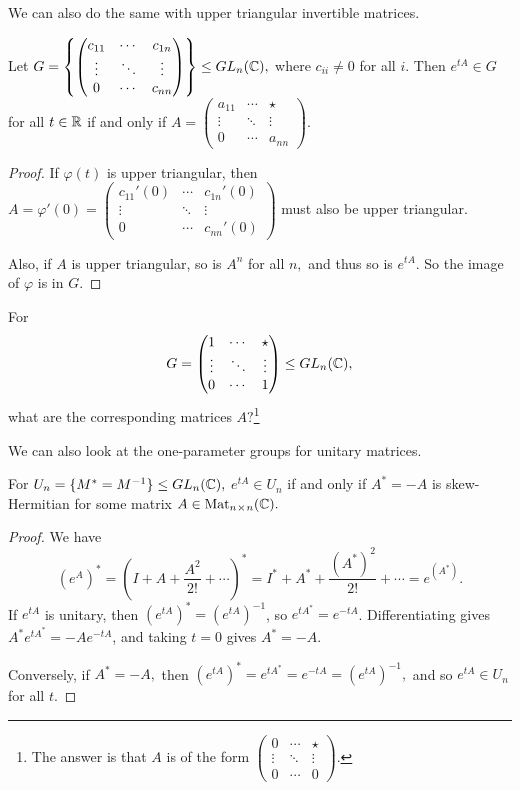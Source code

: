 We can also do the same with upper triangular invertible matrices. 
\begin{example}
Let $G = \left\{\begin{pmatrix} c_{11} & \cdots & c_{1n} \\ \vdots & \ddots & \vdots \\ 0 & \cdots & c_{nn} \end{pmatrix}\right\} \leq GL_n(\mathbb C),$ where $c_{ii} \neq 0$ for all $i.$ Then $e^{tA} \in G$ for all $t \in \mathbb R$ if and only if $A = \begin{pmatrix} a_{11} & \cdots & \star \\ \vdots & \ddots & \vdots \\ 0 & \cdots & a_{nn} \end{pmatrix}$. 
\end{example}

\begin{proof}
If $\varphi(t)$ is upper triangular, then $A = \varphi'(0) = \begin{pmatrix} c_{11}'(0) & \cdots & c_{1n}'(0) \\ \vdots & \ddots & \vdots \\ 0 & \cdots & c_{nn}'(0) \end{pmatrix}$ must also be upper triangular. 

Also, if $A$ is upper triangular, so is $A^n$ for all $n,$ and thus so is $e^{tA}.$ So the image of $\varphi$ is in $G.$
\end{proof}

\begin{problem}
For \[G = \begin{pmatrix} 1 & \cdots & \star \\ \vdots & \ddots & \vdots \\ 0 & \cdots & 1 \end{pmatrix} \leq GL_n(\mathbb C),\] what are the corresponding matrices $A?$\footnote{The answer is that $A$ is of the form $\begin{pmatrix} 0 & \cdots & \star \\ \vdots & \ddots & \vdots \\ 0 & \cdots & 0 \end{pmatrix}$.}
\end{problem}

We can also look at the one-parameter groups for unitary matrices. 
\begin{example}
For $U_n = \{M^* = M^{-1}\} \leq GL_n(\mathbb C),$ $e^{tA} \in U_n$ if and only if $A^* = -A$ is skew-Hermitian for some matrix $A \in \text{Mat}_{n \hspace{0.05em}{\times}\hspace{0.05em} n}(\mathbb C).$ 
\end{example}

\begin{proof}
We have 
\[
(e^A)^* = \left(I + A + \frac{A^2}{2!} + \cdots\right)^* = I^* + A^* + \frac{(A^*)^2}{2!} + \cdots  = e^{(A^*)}. 
\]
If $e^{tA}$ is unitary, then $(e^{tA})^* = (e^{tA})^{-1}$, so $e^{tA^*} = e^{-tA}$. Differentiating gives $A^*e^{tA^*} = -Ae^{-tA}$, and taking $t = 0$ gives $A^* = -A$. 

Conversely, if $A^* = -A,$ then $(e^{tA})^* = e^{tA^*} = e^{-tA} = (e^{tA})^{-1},$ and so $e^{tA} \in U_n$ for all $t.$
\end{proof}

\newpage